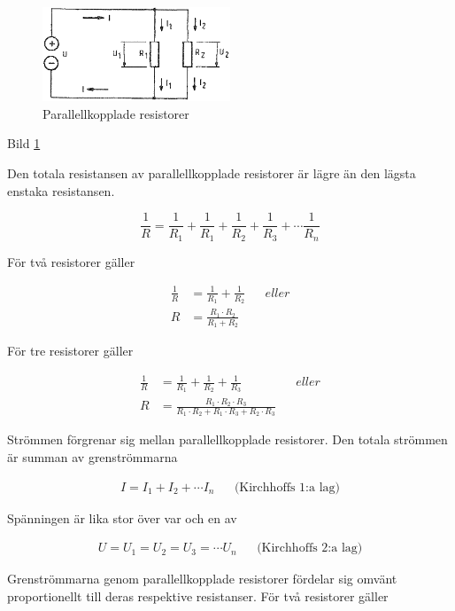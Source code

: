 \begin{figure}
\includegraphics[width=0.5\textwidth]{images/bild_2_3-02.png}
\caption{Parallellkopplade resistorer}
\label{fig:BildII3-02}
\end{figure}

Bild \ref{fig:BildII3-02}

Den totala resistansen av parallellkopplade resistorer är lägre än den lägsta
enstaka resistansen.

\[
\frac{1}{R} = \frac{1}{R_1} + \frac{1}{R_1} +
\frac{1}{R_2} + \frac{1}{R_3} + \cdots \frac{1}{R_n}
\]

För två resistorer gäller

\begin{align*}
\frac{1}{R} &= \frac{1}{R_1} + \frac{1}{R_2} && eller \\
R &= \frac{R_1 \cdot R_2}{R_1 + R_2}
\end{align*}

För tre resistorer gäller

\begin{align*}
\frac{1}{R} &= \frac{1}{R_1} + \frac{1}{R_2} + \frac{1}{R_3} && eller \\
R &= \frac{R_1\cdot R_2\cdot R_3}{R_1\cdot R_2 + R_1\cdot R_3 + R_2\cdot R_3}
\end{align*}

Strömmen förgrenar sig mellan parallellkopplade resistorer. Den totala strömmen
är summan av grenströmmarna

\begin{align*}
  I = I_1 + I_2 + \cdots I_n && \text{(Kirchhoffs 1:a lag)}
\end{align*}

Spänningen är lika stor över var och en av

\begin{align*}
  U = U_1 = U_2 = U_3 = \cdots U_n && \text{(Kirchhoffs 2:a lag)}
\end{align*}

Grenströmmarna genom parallellkopplade resistorer fördelar sig omvänt
proportionellt till deras respektive resistanser.
För två resistorer gäller


